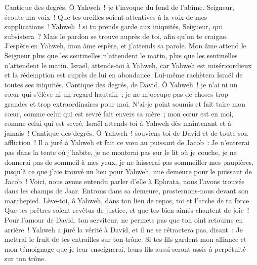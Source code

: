 \begin{multicols}{2}
\VerseOne{}Cantique des degrés. Ô Yahweh~! je t'invoque du fond de l'abîme.
Seigneur, écoute ma voix~! Que tes oreilles soient attentives à la voix de mes supplications~!
Yahweh~! si tu prends garde aux iniquités, Seigneur, qui subsistera~?
Mais le pardon se trouve auprès de toi, afin qu'on te craigne.
J'espère en Yahweh, mon âme espère, et j'attends sa parole.
Mon âme attend le Seigneur plus que les sentinelles n'attendent le matin, plus que les sentinelles n'attendent le matin.
Israël, attends-toi à Yahweh, car Yahweh est miséricordieux et la rédemption est auprès de lui en abondance.
Lui-même rachètera Israël de toutes ses iniquités.
\VerseOne{}Cantique des degrés, de David. Ô Yahweh~! je n'ai ni un cœur qui s'élève ni un regard hautain~; je ne m'occupe pas de choses trop grandes et trop extraordinaires pour moi.
N'ai-je point soumis et fait taire mon cœur, comme celui qui est sevré fait envers sa mère~; mon cœur est en moi, comme celui qui est sevré.
Israël attends-toi à Yahweh dès maintenant et à jamais~!
\VerseOne{}Cantique des degrés. Ô Yahweh~! souviens-toi de David et de toute son affliction~!
Il a juré à Yahweh et fait ce vœu au puissant de Jacob~:
Je n'entrerai pas dans la tente où j'habite, je ne monterai pas sur le lit où je couche,
je ne donnerai pas de sommeil à mes yeux, je ne laisserai pas sommeiller mes paupières,
jusqu'à ce que j'aie trouvé un lieu pour Yahweh, une demeure pour le puissant de Jacob~!
Voici, nous avons entendu parler d'elle à Ephrata, nous l'avons trouvée dans les champs de Jaar.
Entrons dans sa demeure, prosternons-nous devant son marchepied.
Lève-toi, ô Yahweh, dans ton lieu de repos, toi et l'arche de ta force.
Que tes prêtres soient revêtus de justice, et que tes bien-aimés chantent de joie~!
Pour l'amour de David, ton serviteur, ne permets pas que ton oint retourne en arrière~!
Yahweh a juré la vérité à David, et il ne se rétractera pas, disant~: Je mettrai le fruit de tes entrailles sur ton trône.
Si tes fils gardent mon alliance et mon témoignage que je leur enseignerai, leurs fils aussi seront assis à perpétuité sur ton trône.

\end{multicols}
